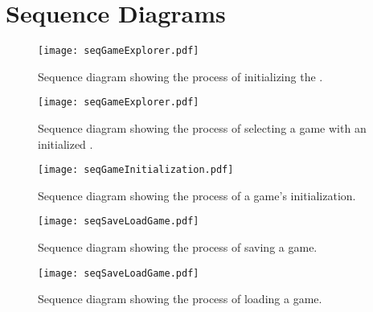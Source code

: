 \section{Sequence Diagrams}

\begin{figure}[h]
	\centering
	\texttt{[image: seqGameExplorer.pdf]}
	\caption{Sequence diagram showing the process of initializing the \gameexplorer.}
	\label{img:seqGameExplorer}
\end{figure}

\begin{figure}[h]
	\centering
	\texttt{[image: seqGameExplorer.pdf]}
	\caption{Sequence diagram showing the process of selecting a game with an initialized \gameexplorer.}
	\label{img:seqGameExplorer}
\end{figure}

\begin{figure}[h]
	\centering
	\texttt{[image: seqGameInitialization.pdf]}
	\caption{Sequence diagram showing the process of a game's initialization.}
	\label{img:seqGameInitialization}
\end{figure}

\begin{figure}[h]
	\centering
	\texttt{[image: seqSaveLoadGame.pdf]}
	\caption{Sequence diagram showing the process of saving a game.}
	\label{img:seqSaveLoadGame}
\end{figure}

\begin{figure}[h]
	\centering
	\texttt{[image: seqSaveLoadGame.pdf]}
	\caption{Sequence diagram showing the process of loading a game.}
	\label{img:seqSaveLoadGame}
\end{figure}